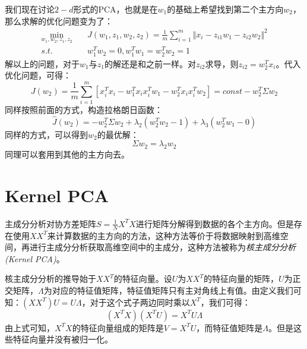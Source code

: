 \documentclass[UTF8, 12pt]{ctexart}
\begin{document}
我们现在讨论$2-d$形式的PCA，也就是在$w_1$的基础上希望找到第二个主方向$w_{2}$，那么求解的优化问题变为了：
\begin{align}
	\min_{w_{1}, w_{2}, z_{1}, z_{2}} & \quad J(w_1, z_{1}, w_{2}, z_{2}) = \frac{1}{m} \sum_{i=1}^{m} {\Vert x_{i} - z_{i1}w_{1} - z_{i2}w_{2} \Vert}^{2} \\
						  s.t. & \quad w_{1}^{T}w_{2} = 0, w_{1}^{T}w_{1}=w_{2}^{T}w_{2}=1
\end{align}
解以上的问题，对于$w_{1}$与$z_{1}$的解还是和之前一样。对$z_{i2}$求导，则$z_{i2}=w_{2}^{T}x_{i}$。代入优化问题，可得：
\begin{equation}
	J(w_{2}) = \frac{1}{m} \sum_{i=1}^{m} [x_{i}^{T}x_{i} - w_{1}^{T}x_{i}x_{i}^{T}w_{1} - w_{2}^{T}x_{i}x_{i}^{T}w_{2}] = const - w_{2}^{T}\Sigma w_{2}
\end{equation}
同样按照前面的方式，构造拉格朗日函数：
\begin{equation}
	\hat{J}(w_{2}) = - w_{2}^{T}\Sigma w_{2} + \lambda_{2}(w_{2}^{T}w_{2}-1) + \lambda_{3}(w_{2}^{T}w_{1}-0)
\end{equation}
同样的方式，可以得到$w_{2}$的最优解：
\begin{equation}
	\Sigma w_{2} = \lambda_{2}w_{2}
\end{equation}
同理可以套用到其他的主方向去。

\section{Kernel PCA}
主成分分析对协方差矩阵$S=\frac{1}{N}X^{T}X$进行矩阵分解得到数据的各个主方向。但是存在使用$XX^{T}$来计算数据的主方向的方法，这种方法等价于将数据映射到高维空间，再进行主成分分析获取高维空间中的主成分，这种方法被称为\emph{核主成分分析(Kernel PCA)}。

核主成分分析的推导始于$XX^{T}$的特征向量。设$U$为$XX^{T}$的特征向量的矩阵，$U$为正交矩阵，$\Lambda$为对应的特征值矩阵，特征值矩阵只有主对角线上有值。由定义我们可知：$(XX^{T})U=U\Lambda$，对于这个式子两边同时乘以$X^{T}$，我们可得：
\begin{equation}
	(X^{T}X) (X^{T}U) = X^{T}U\Lambda
\end{equation}
由上式可知，$X^{T}X$的特征向量组成的矩阵是$V=X^{T}U$，而特征值矩阵是$\Lambda$。但是这些特征向量并没有被归一化。

  
  
\end{document}
